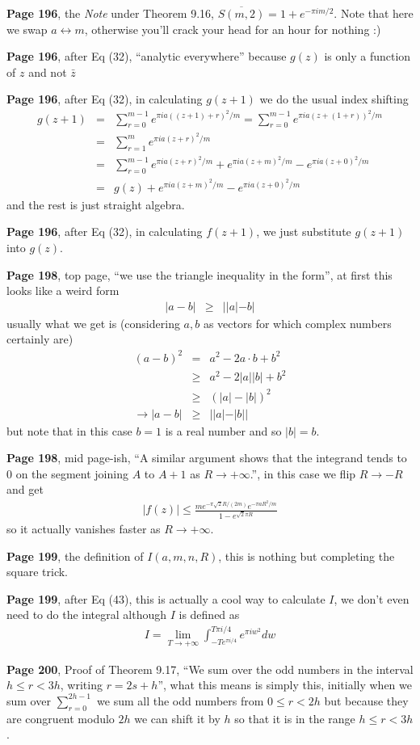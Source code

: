 \documentclass[aps,preprint,preprintnumbers,nofootinbib,showpacs,prd]{revtex4-1}
\newcommand{\nbea}{\begin{eqnarray*}}
\newcommand{\neea}{\end{eqnarray*}}
\begin{document}
{\bf Page 196}, the {\it Note} under Theorem 9.16, $\overline{S(m,2)} = 1 + e^{-\pi i m/2}$. Note that here we swap $a \leftrightarrow m$, otherwise you'll crack your head for an hour for nothing :)

{\bf Page 196}, after Eq (32), ``analytic everywhere'' because $g(z)$ is only a function of $z$ and not $\bar{z}$

{\bf Page 196}, after Eq (32), in calculating $g(z+1)$ we do the usual index shifting
%
\nbea
g(z + 1) & = & \sum_{r=0}^{m-1} e^{\pi i a((z + 1) +r)^2/m} = \sum_{r=0}^{m-1} e^{\pi i a(z + (1 +r))^2/m} \\
& = & \sum_{r=1}^{m} e^{\pi i a(z + r)^2/m} \\
& = & \sum_{r=0}^{m-1} e^{\pi i a(z + r)^2/m} + e^{\pi i a(z + m)^2/m} -  e^{\pi i a(z + 0)^2/m}\\
& = & g(z) + e^{\pi i a(z + m)^2/m} -  e^{\pi i a(z + 0)^2/m}
\neea
%
and the rest is just straight algebra.

{\bf Page 196}, after Eq (32), in calculating $f(z+1)$, we just substitute $g(z+1)$ into $g(z)$.

{\bf Page 198}, top page, ``we use the triangle inequality in the form'', at first this looks like a weird form
%
\nbea
|a-b| & \ge & ||a| - b|
\neea
%
usually what we get is (considering $a,b$ as vectors for which complex numbers certainly are)
%
\nbea
(a-b)^2 & = & a^2 - 2a\cdot b + b^2 \\
& \ge & a^2 - 2|a| |b| + b^2 \\
& \ge & (|a| - |b|)^2 \\
\to |a - b| & \ge & ||a| - |b||
\neea
%
but note that in this case $b=1$ is a real number and so $|b| = b$.

{\bf Page 198}, mid page-ish, ``A similar argument shows that the integrand tends to 0 on the segment joining $A$ to $A+1$ as $R\to+\infty$.'', in this case we flip $R\to-R$ and get
%
\nbea
|f(z)| \le \frac{m e^{-\pi\sqrt{2}R/(2m)}e^{-\pi a R^2/m}}{1 - e^{\sqrt{2}\pi R}}
\neea
%
so it actually vanishes  faster as $R\to+\infty$.

{\bf Page 199}, the definition of $I(a,m,n,R)$, this is nothing but completing the square trick.

{\bf Page 199}, after Eq (43), this is actually a cool way to calculate $I$, we don't even need to do the integral although $I$ is defined as
%
\nbea
I = \lim_{T\to+\infty}\int_{-Te^{\pi i/4}}^{T\pi i/4} e^{\pi i w^2} dw
\neea
%

{\bf Page 200}, Proof of Theorem 9.17, ``We sum over the odd numbers in the interval $h \le r < 3h$, writing $r = 2s + h$'', what this means is simply this, initially when we sum over $\sum_{r=0}^{2h-1}$ we sum all the odd numbers from $0 \le r < 2h$ but because they are congruent modulo $2h$ we can shift it by $h$ so that it is in the range $h \le r < 3h$.
\end{document}
